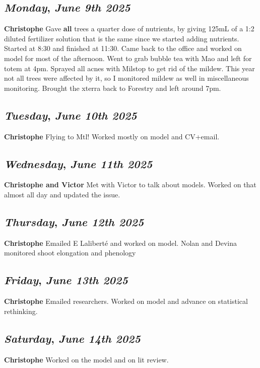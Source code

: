 \def\day{\textit{June 9th 2025}}
\def\weekday{\textit{Monday}}
\subsection*{\weekday, \day}
\textbf {Christophe}
Gave \textbf{all} trees a quarter dose of nutrients, by giving 125mL of a 1:2 diluted fertilizer solution that is the same since we started adding nutrients. Started at 8:30 and finished at 11:30. Came back to the office and worked on model for most of the afternoon. Went to grab bubble tea with Mao and left for totem at 4pm. Sprayed all acnes with Milstop to get rid of the mildew. This year not all trees were affected by it, so I monitored mildew as well in miscellaneous monitoring. Brought the xterra back to Forestry and left around 7pm. 

\def\day{\textit{June 10th 2025}}
\def\weekday{\textit{Tuesday}}
\subsection*{\weekday, \day}
\textbf {Christophe}
Flying to Mtl! Worked mostly on model and CV+email.

\def\day{\textit{June 11th 2025}}
\def\weekday{\textit{Wednesday}}
\subsection*{\weekday, \day}
\textbf {Christophe and Victor}
Met with Victor to talk about models. Worked on that almost all day and updated the issue. 

\def\day{\textit{June 12th 2025}}
\def\weekday{\textit{Thursday}}
\subsection*{\weekday, \day}
\textbf {Christophe}
Emailed E Laliberté and worked on model. Nolan and Devina monitored shoot elongation and phenology
\def\day{\textit{June 13th 2025}}
\def\weekday{\textit{Friday}}
\subsection*{\weekday, \day}
\textbf {Christophe}
Emailed researchers. Worked on model and advance on statistical rethinking. 

\def\day{\textit{June 14th 2025}}
\def\weekday{\textit{Saturday}}
\subsection*{\weekday, \day}
\textbf {Christophe}
Worked on the model and on lit review.

